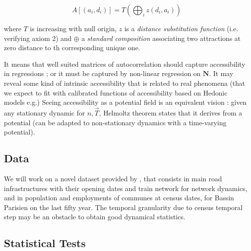 \[
A\left[(a_i,d_i)\right] = T\left(\bigoplus_i z(d_i,a_i)\right)
\]

where $T$ is increasing with null origin, $z$ is a \emph{distance substitution function} (i.e. verifying axiom 2) and $\oplus$ a \emph{standard composition} associating two attractions at zero distance to th corresponding unique one. 

It means that well suited matrices of autocorrelation should capture accessibility in regressions ; or it must be captured by non-linear regression on $\mathbf{N}$. It may reveal some kind of intrinsic accessibility that is related to real phenomena (that we expect to fit with calibrated functions of accessibility based on Hedonic models e.g.) Seeing accessibility as a potential field is an equivalent vision : given any stationary dynamic for $n,\vec{T}$, Helmoltz theorem states that it derives from a potential (can be adapted to non-stationary dynamics with a time-varying potential).




\subsection{Data}

We will work on a novel dataset provided by , that consists in main road infrastructures with their opening dates and train network for network dynamics, and in population and employments of communes at census dates, for Bassin Parisien on the last fifty year. The temporal granularity due to census temporal step may be an obstacle to obtain good dynamical statistics.


\subsection{Statistical Tests}


